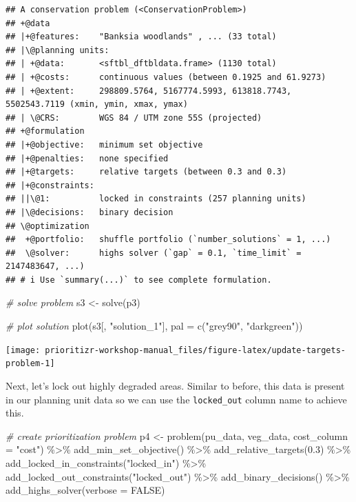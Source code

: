 \documentclass[
  12pt,
]{book}
\newenvironment{Shaded}{\begin{snugshade}}{\end{snugshade}}
\newcommand{\AttributeTok}[1]{\textcolor[rgb]{0.77,0.63,0.00}{#1}}
\newcommand{\CommentTok}[1]{\textcolor[rgb]{0.56,0.35,0.01}{\textit{#1}}}
\newcommand{\ConstantTok}[1]{\textcolor[rgb]{0.00,0.00,0.00}{#1}}
\newcommand{\FloatTok}[1]{\textcolor[rgb]{0.00,0.00,0.81}{#1}}
\newcommand{\FunctionTok}[1]{\textcolor[rgb]{0.00,0.00,0.00}{#1}}
\newcommand{\NormalTok}[1]{#1}
\newcommand{\OtherTok}[1]{\textcolor[rgb]{0.56,0.35,0.01}{#1}}
\newcommand{\SpecialCharTok}[1]{\textcolor[rgb]{0.00,0.00,0.00}{#1}}
\newcommand{\StringTok}[1]{\textcolor[rgb]{0.31,0.60,0.02}{#1}}
\begin{document}
\begin{verbatim}
## A conservation problem (<ConservationProblem>)
## +@data
## |+@features:    "Banksia woodlands" , ... (33 total)
## |\@planning units:
## | +@data:       <sftbl_dftbldata.frame> (1130 total)
## | +@costs:      continuous values (between 0.1925 and 61.9273)
## | +@extent:     298809.5764, 5167774.5993, 613818.7743, 5502543.7119 (xmin, ymin, xmax, ymax)
## | \@CRS:        WGS 84 / UTM zone 55S (projected)
## +@formulation
## |+@objective:   minimum set objective
## |+@penalties:   none specified
## |+@targets:     relative targets (between 0.3 and 0.3)
## |+@constraints:
## ||\@1:          locked in constraints (257 planning units)
## |\@decisions:   binary decision
## \@optimization
##  +@portfolio:   shuffle portfolio (`number_solutions` = 1, ...)
##  \@solver:      highs solver (`gap` = 0.1, `time_limit` = 2147483647, ...)
## # i Use `summary(...)` to see complete formulation.
\end{verbatim}

\begin{Shaded}
\begin{Highlighting}[]
\CommentTok{\# solve problem}
\NormalTok{s3 }\OtherTok{\textless{}{-}} \FunctionTok{solve}\NormalTok{(p3)}

\CommentTok{\# plot solution}
\FunctionTok{plot}\NormalTok{(s3[, }\StringTok{"solution\_1"}\NormalTok{], }\AttributeTok{pal =} \FunctionTok{c}\NormalTok{(}\StringTok{"grey90"}\NormalTok{, }\StringTok{"darkgreen"}\NormalTok{))}
\end{Highlighting}
\end{Shaded}

\begin{center}\texttt{[image: prioritizr-workshop-manual\_files/figure-latex/update-targets-problem-1]} \end{center}

\clearpage

Next, let's lock out highly degraded areas. Similar to before, this data is present in our planning unit data so we can use the \texttt{locked\_out} column name to achieve this.

\begin{Shaded}
\begin{Highlighting}[]
\CommentTok{\# create prioritization problem}
\NormalTok{p4 }\OtherTok{\textless{}{-}}
  \FunctionTok{problem}\NormalTok{(pu\_data, veg\_data, }\AttributeTok{cost\_column =} \StringTok{"cost"}\NormalTok{) }\SpecialCharTok{\%\textgreater{}\%}
  \FunctionTok{add\_min\_set\_objective}\NormalTok{() }\SpecialCharTok{\%\textgreater{}\%}
  \FunctionTok{add\_relative\_targets}\NormalTok{(}\FloatTok{0.3}\NormalTok{) }\SpecialCharTok{\%\textgreater{}\%}
  \FunctionTok{add\_locked\_in\_constraints}\NormalTok{(}\StringTok{"locked\_in"}\NormalTok{) }\SpecialCharTok{\%\textgreater{}\%}
  \FunctionTok{add\_locked\_out\_constraints}\NormalTok{(}\StringTok{"locked\_out"}\NormalTok{) }\SpecialCharTok{\%\textgreater{}\%}
  \FunctionTok{add\_binary\_decisions}\NormalTok{() }\SpecialCharTok{\%\textgreater{}\%}
  \FunctionTok{add\_highs\_solver}\NormalTok{(}\AttributeTok{verbose =} \ConstantTok{FALSE}\NormalTok{)}
\end{Highlighting}
\end{Shaded}
\end{document}
